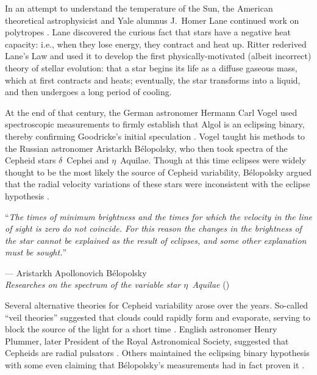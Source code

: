 In an attempt to understand the temperature of the Sun, the American theoretical astrophysicist and Yale alumnus J.\ Homer Lane continued work on polytropes \citep[e.g.,][]{1870AmJS...50...57L}. 
Lane discovered the curious fact that stars have a negative heat capacity: i.e., when they lose energy, they contract and heat up. 
Ritter rederived Lane's Law and used it to develop the first physically-motivated (albeit incorrect) theory of stellar evolution: that a star begins its life as a diffuse gaseous mass, which at first contracts and heats; eventually, the star transforms into a liquid, and then undergoes a long period of cooling. 


At the end of that century, the German astronomer Hermann Carl Vogel used spectroscopic measurements to firmly establish that Algol is an eclipsing binary, thereby confirming Goodricke's initial speculation \citep{1889AN....121..241V, 1908ApJ....27....1F}. 
Vogel taught his methods to the Russian astronomer Aristarkh B{\'e}lopolsky, who then took spectra of the Cepheid stars $\delta$~Cephei and $\eta$~Aquilae. 
Though at this time eclipses were widely thought to be the most likely the source of Cepheid variability, B{\'e}lopolsky argued that the radial velocity variations of these stars were inconsistent with the eclipse hypothesis \citep{1897ApJ.....6..393B, 1895ApJ.....1..160B}. 
\epigraph{``\emph{The times of minimum brightness and the times for which the velocity in the line \hphantom{``}of sight is zero do not coincide. For this reason the changes in the brightness of \hphantom{``}the star cannot be explained as the result of eclipses, and some other explanation \hphantom{``}must be sought.}''}{--- Aristarkh Apollonovich B{\'e}lopolsky \\\textit{Researches on the spectrum of the variable star $\eta$~Aquilae} (\citeyear{1897ApJ.....6..393B})}

Several alternative theories for Cepheid variability arose over the years. 
So-called ``veil theories'' suggested that clouds could rapidly form and evaporate, serving to block the source of the light for a short time \citep[e.g.,][]{1889Natur..39..606B}. 
English astronomer Henry Plummer, later President of the Royal Astronomical Society, suggested that Cepheids are radial pulsators \citep{1914MNRAS..74..660P}. 
Others maintained the eclipsing binary hypothesis \citep[e.g.,][]{1909LicOB...5...82D} with some even claiming that B{\'e}lopolsky's measurements had in fact proven it \citep[e.g.,][]{1913Obs....36...59B}. 

